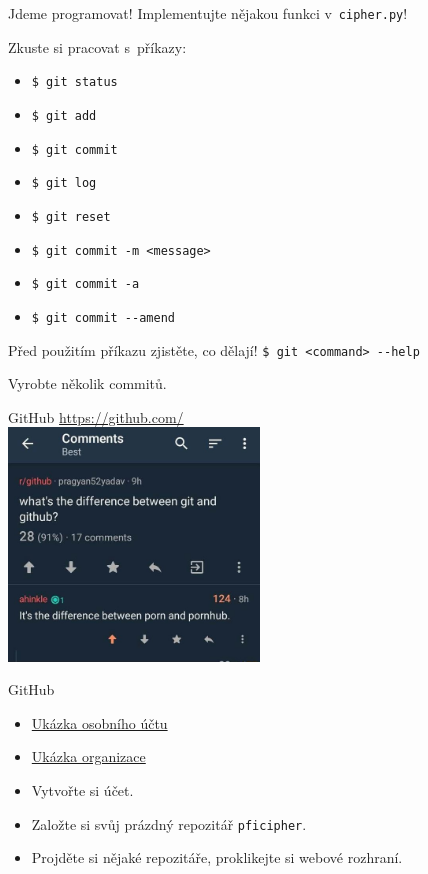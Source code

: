 \documentclass[
]{beamer}
\begin{document}
\begin{frame}{Jdeme programovat!}
Implementujte nějakou funkci v \texttt{cipher.py}!

Zkuste si pracovat s příkazy:

\begin{itemize}
	\item \texttt{\$ git status}
	\item \texttt{\$ git add}
	\item \texttt{\$ git commit}
	\item \texttt{\$ git log}
	\item \texttt{\$ git reset}
	\item \texttt{\$ git commit -m <message>}
	\item \texttt{\$ git commit -a}
	\item \texttt{\$ git commit -{}-amend}
\end{itemize}

\begin{block}{Před použitím příkazu zjistěte, co dělají!}
\texttt{\$ git <command> -{}-help}
\end{block}

Vyrobte několik commitů.
\end{frame}


\begin{frame}{GitHub}
\centering
\url{https://github.com/} \vspace{1em} \\
\includegraphics[width=0.5\textwidth]{images/gitgithub.jpg}
\end{frame}


\begin{frame}{GitHub}
\begin{itemize}
	\item \href{https://github.com/horacekj}{Ukázka osobního účtu}
	\item \href{https://github.com/fi-ksi}{Ukázka organizace}
	\pause
	\item Vytvořte si účet.
	\item Založte si svůj prázdný repozitář \texttt{pficipher}.
	\item Projděte si nějaké repozitáře, proklikejte si webové rozhraní.
\end{itemize}
\end{frame}
\end{document}
